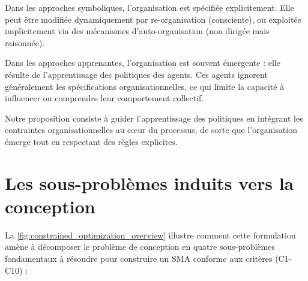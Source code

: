 Dans les approches symboliques, l'organisation est spécifiée explicitement. Elle peut être modifiée dynamiquement par re-organisation (consciente), ou exploitée implicitement via des mécanismes d'auto-organisation (non dirigée mais raisonnée).

Dans les approches apprenantes, l'organisation est souvent émergente : elle résulte de l'apprentissage des politiques des agents. Ces agents ignorent généralement les spécifications organisationnelles, ce qui limite la capacité à influencer ou comprendre leur comportement collectif.

Notre proposition consiste à guider l'apprentissage des politiques en intégrant les contraintes organisationnelles au cœur du processus, de sorte que l'organisation émerge tout en respectant des règles explicites.


\section{Les sous-problèmes induits vers la conception}

La \autoref{fig:constrained_optimization_overview} illustre comment cette formulation amène à décomposer le problème de conception en quatre sous-problèmes fondamentaux à résoudre pour construire un \ac{SMA} conforme aux critères (C1-C10) :

